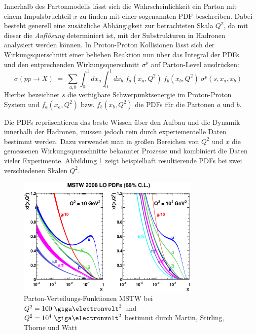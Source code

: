 Innerhalb des Partonmodells lässt sich die Wahrscheinlichkeit ein Parton mit
einem Impulsbruchteil $x$ zu finden mit einer sogenannten \ac{PDF} beschreiben.
Dabei besteht generell eine zusätzliche Abhängigkeit zur betrachteten Skala
$Q^2$, da mit dieser die \textit{Auflösung} determiniert ist, mit der
Substrukturen in Hadronen analysiert werden können. In Proton-Proton
Kollisionen lässt sich der Wirkungsquerschnitt einer belieben Reaktion nun über
das Integral der \ac{PDF}s und den entprechenden Wirkungsquerschnitt $\sigma^p$
auf Parton-Level ausdrücken:
\begin{equation}
    \sigma(pp\rightarrow X) \;=\; \sum_{a,b} \int_0^1 dx_a \int_0^1 dx_b \;
        f_a(x_a,Q^2) \: f_b(x_b,Q^2) \: \sigma^p(s,x_a,x_b)
    \label{eq:hadron_wq}
\end{equation}
Hierbei bezeichnet $s$ die verfügbare Schwerpunktsenergie im Proton-Proton
System und $f_a(x_a,Q^2)$ bzw. $f_b(x_b,Q^2)$ die \ac{PDF}s für die Partonen
$a$ und $b$.

Die \ac{PDF}s repräsentieren das beste Wissen über den Aufbau und die Dynamik
innerhalb der Hadronen, müssen jedoch rein durch experiementelle Daten bestimmt
werden. Dazu verwendet man in großen Bereichen von $Q^2$ und $x$ die gemessenen
Wirkungsquerschnitte bekannter Prozesse und kombiniert die Daten vieler
Experimente. Abbildung \ref{fig:mstw} zeigt beispielhaft resultierende
\ac{PDF}s bei zwei verschiedenen Skalen $Q^2$.

\begin{figure}
    \centering
    \includegraphics[width=0.8\textwidth]{img/mstw}
    \caption[Parton-Verteilungs-Funktionen MSTW bei $Q^2=100\GeV^2$ und
        $Q^2=10^4\GeV^2$]
        {Parton-Verteilungs-Funktionen MSTW bei \mbox{$Q^2=100\GeV^2$} und 
        \mbox{$Q^2=10^4\GeV^2$} bestimmt durch Martin, Stirling, Thorne und
        Watt \cite{Martin:2009iq}}
    \label{fig:mstw}
\end{figure}

